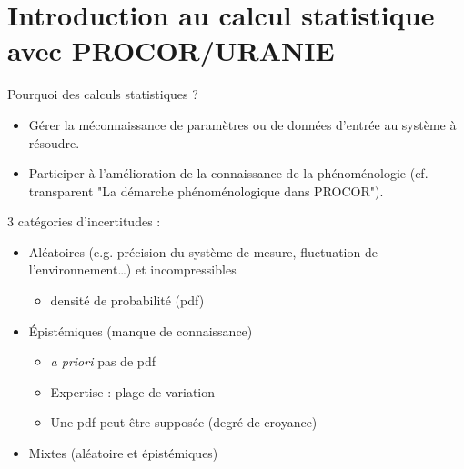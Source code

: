 
\section{Introduction au calcul statistique avec PROCOR/URANIE}
\begin{frame}[fragile]
Pourquoi des calculs statistiques ?
\begin{itemize}
\item Gérer la méconnaissance de paramètres ou de données d'entrée au système à résoudre.
\item Participer à l'amélioration de la connaissance de la phénoménologie (cf. transparent "La démarche phénoménologique dans PROCOR").
\end{itemize}

3 catégories d’incertitudes :

\begin{itemize}
\item Aléatoires (e.g. précision du système de mesure, fluctuation de l’environnement…) et
incompressibles
\begin{itemize}
\item densité de probabilité (pdf)
\end{itemize}
\item Épistémiques (manque de connaissance)
\begin{itemize}
\item \textit{a priori} pas de pdf
\item Expertise : plage de variation
\item Une pdf peut-être supposée (degré de croyance)
\end{itemize}
\item Mixtes (aléatoire et épistémiques)
\end{itemize}



\end{frame}



